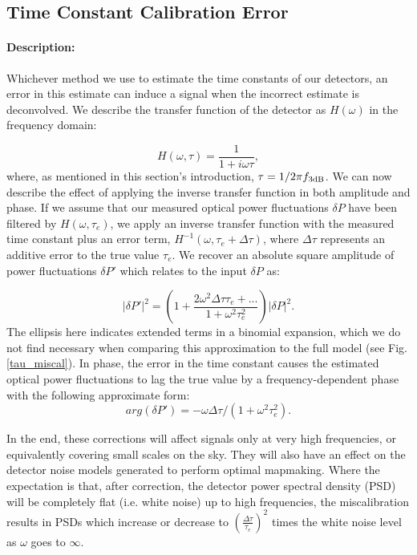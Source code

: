 \subsection{Time Constant Calibration Error}

\paragraph{Description:}
Whichever method we use to estimate the time constants of our detectors, an error in this estimate can induce a signal when the incorrect estimate is deconvolved. We describe the transfer function of the detector as $H(\omega)$ in the frequency domain:

\begin{equation}
\label{tc_transfer}
H(\omega, \tau) = \frac{1}{1 + i \omega \tau},
\end{equation}
where, as mentioned in this section's introduction, $\tau = 1/2 \pi f_{\mbox{\scriptsize 3dB}}$. We can now describe the effect of applying the inverse transfer function in both amplitude and phase. If we assume that our measured optical power fluctuations $\delta P$ have been filtered by $H(\omega, \tau_e)$, we apply an inverse transfer function with the measured time constant plus an error term, $H^{-1} (\omega, \tau_e + \Delta \tau)$, where $\Delta \tau$ represents an additive error to the true value $\tau_e$. We recover an absolute square amplitude of power fluctuations $\delta P'$ which relates to the input $\delta P$ as:

\begin{equation}
\label{amp_correct_approx}
|\delta P'|^2 = (1 + \frac{2 \omega^2 \Delta \tau \tau_e + ...}{1 + \omega^2 \tau_e^2}) |\delta P|^2.
\end{equation}
The ellipsis here indicates extended terms in a binomial expansion, which we do not find necessary when comparing this approximation to the full model (see Fig. \ref{tau_miscal}). In phase, the error in the time constant causes the estimated optical power fluctuations to lag the true value by a frequency-dependent phase with the following approximate form:
\begin{equation}
\label{phase_correct_approx}
arg(\delta P') = -\omega \Delta \tau / (1 + \omega^2 \tau_e^2).
\end{equation}

In the end, these corrections will affect signals only at very high frequencies, or equivalently covering small scales on the sky. They will also have an effect on the detector noise models generated to perform optimal mapmaking. Where the expectation is that, after correction, the detector power spectral density (PSD) will be completely flat (i.e. white noise) up to high frequencies, the miscalibration results in PSDs which increase or decrease to $(\frac{\Delta \tau}{\tau_e})^2$ times the white noise level as $\omega$ goes to $\infty$.

